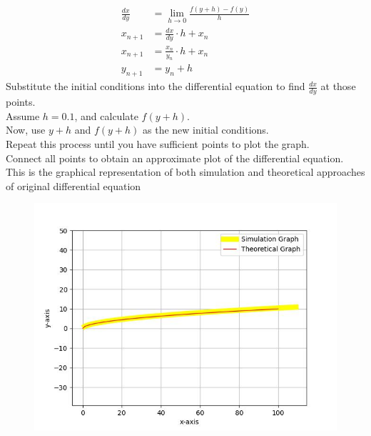 \documentclass[journal]{IEEEtran}
\begin{document}
\begin{align}
     \frac{dx}{dy} &= \lim_{h \to 0}\frac{f(y+h)-f(y)}{h}\\
    x_{n+1} &= \frac{dx}{dy} \cdot h + x_{n}\\
    x_{n+1} &= \frac{x_n}{y_n} \cdot h + x_{n}\\
    y_{n+1} &= y_{n} + h
\end{align}
Substitute the initial conditions into the differential equation to find $\frac{dx}{dy}$ at those points. \\

Assume $h = 0.1$, and calculate $f(y+h)$. \\

Now, use $y+h$ and $f(y+h)$ as the new initial conditions. \\

Repeat this process until you have sufficient points to plot the graph. \\

Connect all points to obtain an approximate plot of the differential equation. \\

This is the graphical representation of both simulation and theoretical approaches of original differential equation

\begin{figure}[h!]
   \centering
   \includegraphics[width=\columnwidth]{fig/combined_fig.jpg}
\end{figure}
\end{document}
